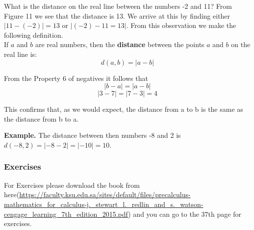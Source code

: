 What is the distance on the real line between the numbers -2 and 11? From
Figure 11 we see that the distance is 13. We arrive at this by finding either
$ |11-(-2)|=13$ or $|(-2)-11=13|$. From this observation we make the following definition. \\

If $a$ and $b$ are real numbers, then the \textbf{distance} between the points $a$ and $b$ on the real line is: \\
$$ d(a,b)=|a-b| $$

From the Property 6 of negatives it follows that
$$ |b-a| = |a-b|$$
$$ |3-7| = |7-3| = 4 $$

This confirms that, as we would expect, the distance from a to b is the same as the
distance from b to a.

\textbf{Example.} The distance between then numbers -8 and 2 is $d(-8,2)=|-8-2|=|-10|=10$.

\subsubsection*{Exercises}
For Exercises please download the book from here(\url{https://faculty.ksu.edu.sa/sites/default/files/precalculus-mathematics_for_calculus-j._stewart_l._redlin_and_s._watson-cengage_learning_7th_edition_2015.pdf}) and you can go to the 37th page for exercises. 